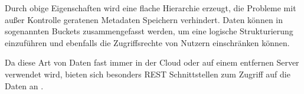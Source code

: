 Durch obige Eigenschaften wird eine flache Hierarchie erzeugt, die Probleme mit außer Kontrolle geratenen Metadaten Speichern verhindert. Daten können in sogenannten Buckets zusammengefasst werden, um eine logische Strukturierung einzuführen und ebenfalls die Zugriffsrechte von Nutzern einschränken können.  

Da diese Art von Daten fast immer in der Cloud oder auf einem entfernen Server verwendet wird, bieten sich besonders REST Schnittstellen zum Zugriff auf die Daten an \parencite[S. 4f]{Rios.2017}.

